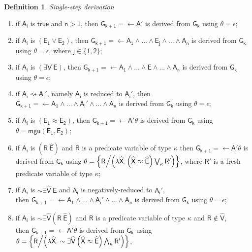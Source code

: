 \documentclass[inscr,ack,preface]{dithesis}
\theoremstyle{definition}
\newtheorem{definition}{Definition}[]
\newcommand{\msf}[1]{$\mathsf{#1}$}
\begin{document}
\begin{definition}{\emph{Single-step derivation}}
\begin{enumerate}
  \item if \msf{A_i} is \msf{true} and \msf{n > 1},
        then \msf{G_{k+1} = \leftarrow A'} is derived from \msf{G_k}
        using \msf{\theta = \epsilon};
  \item if \msf{A_i} is \msf{\left( E_1 \lor E_2 \right)},
        then \msf{G_{k+1} = \leftarrow A_1 \land \dots \land E_j \land \dots \land A_n} is derived from \msf{G_k}
        using \msf{\theta = \epsilon}, where \msf{j \in \{1,2\}};
  \item if \msf{A_i} is \msf{\left( \exists V ~ E \right)},
        then \msf{G_{k+1} = \leftarrow A_1 \land \dots \land E \land \dots \land A_n} is derived from \msf{G_k} using \msf{\theta = \epsilon};
  \item if \msf{A_i \rightsquigarrow A_i'}, namely \msf{A_i} is reduced to \msf{A_i'},
        then \msf{G_{k+1} = \leftarrow A_1 \land \dots \land A_i' \land \dots \land A_n} is derived from \msf{G_k} using \msf{\theta = \epsilon};
  \item if \msf{A_i} is \msf{\left( E_1 \approx E_2 \right)},
        then \msf{G_{k+1} = \leftarrow A' \theta} is derived from \msf{G_k} using \msf{\theta = mgu \left( E_1, E_2 \right)};
  \item if \msf{A_i} is \msf{\left( R ~ \widehat{E} \right)}
        and \msf{R} is a predicate variable of type \msf{\kappa}
        then \msf{G_{k+1} = \leftarrow A' \theta} is derived from \msf{G_k}
        using \msf{\theta = \left\{ R \middle/ \left( \lambda \widehat{X} . \left( \widehat{X} \approx \widehat{E} \right) \bigvee_{\kappa} R' \right) \right\}},
        where \msf{R'} is a fresh predicate variable of type \msf{\kappa};
  \item if \msf{A_i} is \msf{\sim \exists \widehat{V} ~ E}
        and \msf{A_i} is negatively-reduced to \msf{A_i'}, \\
        then \msf{G_{k+1} = \leftarrow A_1 \land \dots \land A_i' \land \dots \land A_n} is derived from \msf{G_k} using \msf{\theta = \epsilon};
  \item if \msf{A_i} is \msf{\sim \exists \widehat{V} \left( R ~ \widehat{E} \right)}
        and \msf{R} is a predicate variable of type \msf{\kappa}
        and \msf{R \not\in \widehat{V}}, \\
        then \msf{G_{k+1} = \leftarrow A' \theta} is derived from \msf{G_k}
        using \msf{\theta = \left\{ R \middle/ \left( \lambda \widehat{X} . \sim \exists \widehat{V} \left( \widehat{X} \approx \widehat{E} \right) \bigwedge_{\kappa} R' \right) \right\}},

\end{enumerate}
\end{definition}
\end{document}
